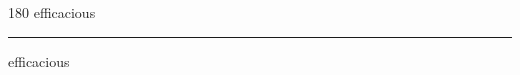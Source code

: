 
\begin{frame}
\begin{center}
\begin{turn}{180}
{\fontsize{2.5cm}{1em}\selectfont efficacious}
\end{turn}
\vspace{1em}\par  
\hrule
\vspace{1em}\par  
{\fontsize{2.5cm}{1em}\selectfont efficacious}
\end{center}
\end{frame}

